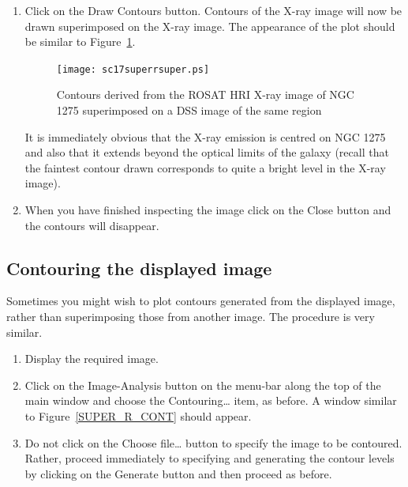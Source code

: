 \documentclass[twoside,11pt]{article}
\renewcommand{\_}{\texttt{\symbol{95}}}
\begin{document}
\begin{enumerate}
  \item Click on the {\sf Draw Contours} button.  Contours of the X-ray
   image will now be drawn superimposed on the X-ray image.  The
   appearance of the plot should be similar to Figure~\ref{SUPER_R_SUPER}.

  \begin{figure}[htbp]
     \centering
     \texttt{[image: sc17\_super\_r\_super.ps]}
     \begin{quote}
     \caption[X-ray contours superimposed a DSS image of NGC 1275]
      {Contours derived from the ROSAT HRI X-ray image of NGC 1275
      superimposed on a DSS image of the same region
     \label{SUPER_R_SUPER} }
     \end{quote}
  \end{figure}

   It is immediately obvious that the X-ray emission is centred on NGC
   1275 and also that it extends beyond the optical limits of the
   galaxy (recall that the faintest contour drawn corresponds to quite
   a bright level in the X-ray image).

  \item When you have finished inspecting the image click on the {\sf
   Close} button and the contours will disappear.

\end{enumerate}

\subsection{Contouring the displayed image}

Sometimes you might wish to plot contours generated from the displayed
image, rather than superimposing those from another image.  The procedure
is very similar.

\begin{enumerate}

  \item Display the required image.

  \item Click on the {\sf Image-Analysis} button on the menu-bar along the
   top of the main window and choose the {\sf Contouring\ldots} item, as
   before.  A window similar to Figure~\ref{SUPER_R_CONT} should appear.

  \item Do not click on the {\sf Choose file\ldots} button to specify
   the image to be contoured.  Rather, proceed immediately to specifying
   and generating the contour levels by clicking on the {\sf Generate}
   button and then proceed as before.

\end{enumerate}
\end{document}
